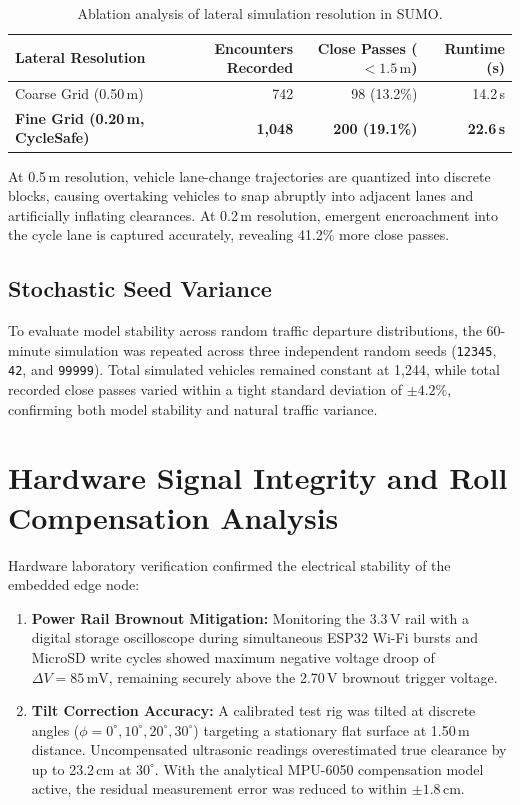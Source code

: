 \begin{table}[h!]
	\centering
	\caption{Ablation analysis of lateral simulation resolution in SUMO.}
	\label{tab:ablation_sublane}
	\setlength{\tabcolsep}{8pt}
	\renewcommand{\arraystretch}{1.2}
	\begin{tabularx}{\textwidth}{|>{\raggedright\arraybackslash}X|r|r|r|}
		\hline
		\textbf{Lateral Resolution} & \textbf{Encounters Recorded} & \textbf{Close Passes ($< 1.5\,\text{m}$)} & \textbf{Runtime (s)} \\
		\hline
		\hline
		Coarse Grid (0.50\,m) & 742 & 98 (13.2\%) & 14.2\,s \\
		\textbf{Fine Grid (0.20\,m, CycleSafe)} & \textbf{1,048} & \textbf{200 (19.1\%)} & \textbf{22.6\,s} \\
		\hline
	\end{tabularx}
\end{table}

At 0.5\,m resolution, vehicle lane-change trajectories are quantized into discrete blocks, causing overtaking vehicles to snap abruptly into adjacent lanes and artificially inflating clearances. At 0.2\,m resolution, emergent encroachment into the cycle lane is captured accurately, revealing 41.2\% more close passes.

\subsection{Stochastic Seed Variance}
To evaluate model stability across random traffic departure distributions, the 60-minute simulation was repeated across three independent random seeds (\texttt{12345}, \texttt{42}, and \texttt{99999}). Total simulated vehicles remained constant at 1,244, while total recorded close passes varied within a tight standard deviation of $\pm 4.2\%$, confirming both model stability and natural traffic variance.

\section{Hardware Signal Integrity and Roll Compensation Analysis}
\label{sec:hardware_benchmarks}
Hardware laboratory verification confirmed the electrical stability of the embedded edge node:
\begin{enumerate}
    \item \textbf{Power Rail Brownout Mitigation:} Monitoring the 3.3\,V rail with a digital storage oscilloscope during simultaneous ESP32 Wi-Fi bursts and MicroSD write cycles showed maximum negative voltage droop of $\Delta V = 85\,\text{mV}$, remaining securely above the 2.70\,V brownout trigger voltage.
    \item \textbf{Tilt Correction Accuracy:} A calibrated test rig was tilted at discrete angles ($\phi = 0^\circ, 10^\circ, 20^\circ, 30^\circ$) targeting a stationary flat surface at 1.50\,m distance. Uncompensated ultrasonic readings overestimated true clearance by up to 23.2\,cm at $30^\circ$. With the analytical MPU-6050 compensation model active, the residual measurement error was reduced to within $\pm 1.8\,\text{cm}$.
\end{enumerate}

